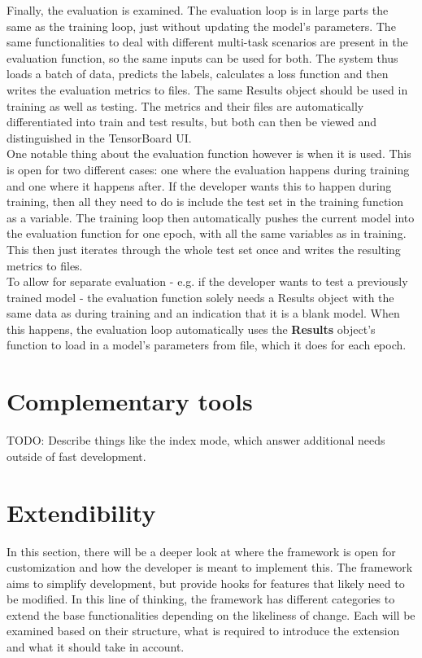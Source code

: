 Finally, the evaluation is examined. The evaluation loop is in large parts the same as the training loop, just without updating the model's parameters. The same functionalities to deal with different multi-task scenarios are present in the evaluation function, so the same inputs can be used for both. The system thus loads a batch of data, predicts the labels, calculates a loss function and then writes the evaluation metrics to files. The same Results object should be used in training as well as testing. The metrics and their files are automatically differentiated into train and test results, but both can then be viewed and distinguished in the TensorBoard UI. \\

One notable thing about the evaluation function however is when it is used. This is open for two different cases: one where the evaluation happens during training and one where it happens after. If the developer wants this to happen during training, then all they need to do is include the test set in the training function as a variable. The training loop then automatically pushes the current model into the evaluation function for one epoch, with all the same variables as in training. This then just iterates through the whole test set once and writes the resulting metrics to files. \\

To allow for separate evaluation - e.g. if the developer wants to test a previously trained model - the evaluation function solely needs a Results object with the same data as during training and an indication that it is a blank model. When this happens, the evaluation loop automatically uses the \textbf{Results} object's function to load in a model's parameters from file, which it does for each epoch. \\

\section{Complementary tools}

TODO: Describe things like the index mode, which answer additional needs outside of fast development.

\section{Extendibility} \label{Impl:Extendibility}

In this section, there will be a deeper look at where the framework is open for customization and how the developer is meant to implement this. The framework aims to simplify development, but provide hooks for features that likely need to be modified. In this line of thinking, the framework has different categories to extend the base functionalities depending on the likeliness of change. Each will be examined based on their structure, what is required to introduce the extension and what it should take in account. 

